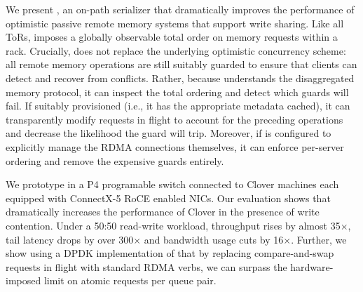 We present {\sword}, an on-path serializer
that dramatically improves the performance of optimistic passive
remote memory systems that support write sharing.  Like all ToRs,
{\sword} imposes a globally observable total order on memory
requests within a rack.  Crucially, {\sword} does not replace the
underlying optimistic concurrency scheme: all remote memory operations
are still suitably guarded to ensure that clients can detect and
recover from conflicts.  Rather, because {\sword} understands the
disaggregated memory protocol, it can inspect the total ordering and
detect which guards will fail.  If suitably provisioned (i.e., it has
the appropriate metadata cached), it can transparently modify requests
in flight to account for the preceding operations and decrease the
likelihood the guard will trip.  Moreover, if {\sword} is configured
to explicitly manage the RDMA connections themselves, it can enforce
per-server ordering and remove the expensive guards entirely.

We prototype {\sword} in a P4 programable switch connected to Clover machines
each equipped with ConnectX-5 RoCE enabled NICs. Our evaluation shows that
{\sword} dramatically increases the performance of Clover in the presence of
write contention. Under a 50:50 read-write workload, throughput rises by almost
35$\times$, tail latency drops by over 300$\times$ and bandwidth usage cuts by
16$\times$. Further, we show using a DPDK implementation of {\sword} that by
replacing compare-and-swap requests in flight with standard RDMA verbs, we can
surpass the hardware-imposed limit on atomic requests per queue pair.

